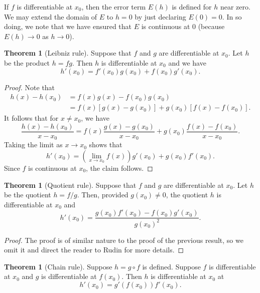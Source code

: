 \documentclass[12pt]{article}
\theoremstyle{definition}
\theoremstyle{theorem}
\newtheorem{theorem}[definition]{Theorem}
\begin{document}
If $f$ is differentiable at $x_0$, then the error term $E(h)$ is defined for $h$ near zero. We may extend the domain of $E$ to $h = 0$ by just declaring $E(0) = 0$. In so doing, we note that we have ensured that $E$ is continuous at $0$ (because $E(h) \to 0$ as $h \to 0$). 

\begin{theorem}[Leibniz rule]
Suppose that $f$ and $g$ are differentiable at $x_0$. Let $h$ be the product $h = fg$. Then $h$ is differentiable at $x_0$ and we have 
\[
h'(x_0) = f'(x_0) g(x_0) + f(x_0)g'(x_0). 
\]
\end{theorem} 

\begin{proof}
Note that 
\begin{align*}
h(x) - h(x_0) &= f(x)g(x) - f(x_0)g(x_0) \\
&= f(x)[g(x) - g(x_0)] + g(x_0)[f(x) - f(x_0)].
\end{align*}
It follows that for $x \ne x_0$, we have 
\[
\frac{h(x) - h(x_0)}{x - x_0} = f(x) \frac{g(x) - g(x_0)}{x - x_0} + g(x_0) \frac{f(x) - f(x_0)}{x - x_0}.
\]
Taking the limit as $x \to x_0$ shows that 
\[
h'(x_0) = \left(\lim_{x \to x_0}f(x)\right)g'(x_0) + g(x_0) f'(x_0).
\]
Since $f$ is continuous at $x_0$, the claim follows. 
\end{proof} 

\begin{theorem}[Quotient rule]
Suppose that $f$ and $g$ are differentiable at $x_0$. Let $h$ be the quotient $h = f/g$. Then, provided $g(x_0) \ne 0$, the quotient $h$ is differentiable at $x_0$ and 
\[
h'(x_0) = \frac{g(x_0)f'(x_0) - f(x_0)g'(x_0)}{g(x_0)^2}.
\]
\end{theorem}

\begin{proof}
The proof is of similar nature to the proof of the previous result, so we omit it and direct the reader to Rudin for more details. 
\end{proof}

\begin{theorem}[Chain rule]
Suppose $h = g \circ f$ is defined. Suppose $f$ is differentiable at $x_0$ and $g$ is differentiable at $f(x_0)$. Then $h$ is differentiable at $x_0$ at 
\[
h'(x_0) = g'(f(x_0))f'(x_0).
\]
\end{theorem}
\end{document}
